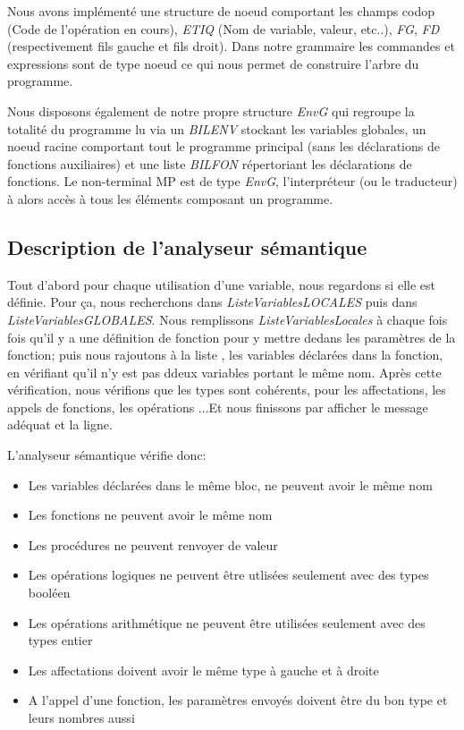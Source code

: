 \documentclass[10pt,a4paper]{article}
\begin{document}
Nous avons implémenté une structure de noeud comportant les champs codop (Code de l'opération en cours), \textit{ETIQ} (Nom de variable, valeur, etc..), \textit{FG}, \textit{FD} 
(respectivement fils gauche et fils droit). Dans notre grammaire les commandes et expressions sont de type noeud ce qui nous permet de construire l'arbre du programme.

Nous disposons également de notre propre structure \textit{EnvG} qui regroupe la totalité du programme lu via un \textit{BILENV} stockant les variables globales, un noeud 
racine comportant tout le programme principal (sans les déclarations de fonctions auxiliaires) et une liste \textit{BILFON} répertoriant les déclarations de fonctions. 
Le non-terminal MP est de type \textit{EnvG}, l'interpréteur (ou le traducteur) à alors accès à tous les éléments composant un programme.

\subsection{Description de l'analyseur sémantique}
Tout d'abord pour chaque utilisation d'une variable, nous regardons si elle est définie. Pour ça, nous recherchons dans \textit{ListeVariablesLOCALES} puis dans \textit{ListeVariablesGLOBALES}. Nous remplissons \textit{ListeVariablesLocales} à chaque fois fois qu'il y a une définition de fonction pour y mettre dedans les paramètres de la fonction; puis nous rajoutons à la liste , les variables déclarées dans la fonction, en vérifiant qu'il n'y est pas ddeux variables portant le même nom.
Après cette vérification, nous vérifions que les types sont cohérents, pour les affectations, les appels de fonctions, les opérations ...Et nous finissons par afficher le message adéquat et la ligne.


L'analyseur sémantique vérifie donc:\newline
\begin{itemize}
    \item Les variables déclarées dans le même bloc, ne peuvent avoir le même nom
    \item Les fonctions ne peuvent avoir le même nom
    \item Les procédures ne peuvent renvoyer de valeur
    \item Les opérations logiques ne peuvent être utlisées seulement avec des types booléen
    \item Les opérations arithmétique ne peuvent être utilisées seulement avec des types entier
    \item Les affectations doivent avoir le même type à gauche et à droite
    \item A l'appel d'une fonction, les paramètres envoyés doivent être du bon type et leurs nombres aussi
\end{itemize}
\end{document}
